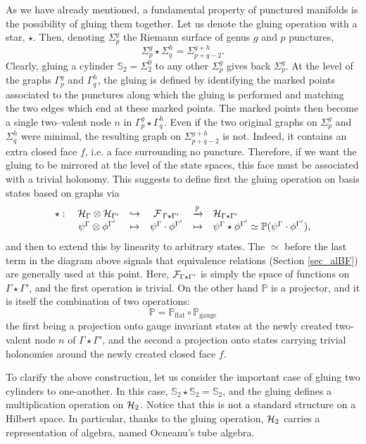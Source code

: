 \documentclass[nofootinbib,superscriptaddress,eqsecnum,tightenlines,11pt]{revtex4-1}
\def\be{\begin{equation}}
\def\ee{\end{equation}}
\renewcommand{\S}{{\mathbb S}}
\begin{document}
As we have already mentioned, a fundamental property of punctured manifolds is the possibility of gluing them together.
Let us denote the gluing operation with a star, $\star$.
Then, denoting $\Sigma^g_p$ the Riemann surface of genus $g$ and $p$ punctures,
\be
\Sigma^g_p \star \Sigma^h_q = \Sigma^{g+h}_{p+q-2}.
\ee 
Clearly, gluing a cylinder $\S_2 = \Sigma^0_2$ to any other $\Sigma^g_p$ gives back $\Sigma^g_p$.
At the level of the graphs $\Gamma^g_p$ and $\Gamma^h_q$, the gluing is defined by identifying the marked points associated to the punctures along which the gluing is performed and matching the two edges which end at these marked points. The marked points then become a single two--valent node $n$ in $\Gamma^g_p\star\Gamma^h_q$.
Even if the two original graphs on $\Sigma^g_p$ and $\Sigma^h_q$ were minimal, the resulting graph on $\Sigma^{g+h}_{p+q-2}$ is not.
Indeed, it contains an extra closed face $f$, i.e. a face surrounding no puncture.
Therefore, if we want the gluing to be mirrored at the level of the state spaces, this face must be associated with a trivial holonomy.
This suggests to define first the gluing operation on basis states based on graphs via
\be
\begin{array}{cccccl}
\star:& \;{\cal H}_{\Gamma} \otimes {\cal H}_{\Gamma'} & \hookrightarrow & {\cal F}_{\;\Gamma\star\Gamma'} & \xrightarrow{{\mathbb P}} &{\cal H}_{\Gamma\star\Gamma'}\\
& \psi^\Gamma \otimes \phi^{\Gamma'} & \mapsto & \psi^\Gamma \cdot \phi^{\Gamma'} & \mapsto & \psi^\Gamma \star \phi^{\Gamma'} \simeq \mathbb P( \psi^\Gamma \cdot \phi^{\Gamma'}),
\end{array}
\ee
and then to extend this by linearity to arbitrary states.
{ The $\simeq$ before the last term in the diagram above signals that equivalence relations (Section \ref{sec_alBF}) are generally used at this point.}
Here, ${\cal F}_{\Gamma\star\Gamma'}$ is simply the space of functions on $\Gamma\star\Gamma'$, and the first operation is trivial.
On the other hand $\mathbb{P}$ is a projector, and it is itself the combination of two operations:
\be
\mathbb P = \mathbb P_\text{flat} \circ \mathbb P_\text{gauge}
\ee 
the first being a projection onto gauge invariant states at the newly created two-valent node $n$ of $\Gamma\star\Gamma'$, and the second a projection onto states carrying trivial holonomies around the newly created closed face $f$.

To clarify the above construction, let us consider the important case of gluing two cylinders to one-another.
In this case, $\S_2\star\S_2 = \S_2$, and the gluing defines a multiplication operation on ${\cal H}_2$.
Notice that this is not a standard structure on a Hilbert space.
In particular, thanks to the gluing operation, ${\cal H}_2$ carries a representation of algebra, named Ocneanu's tube algebra.
\end{document}
